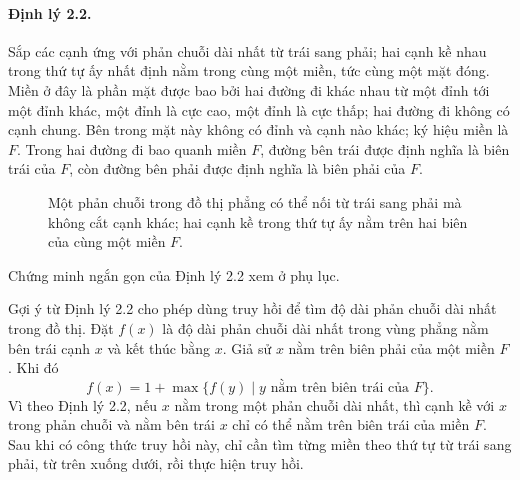 \documentclass[11pt]{article}
\begin{document}
\paragraph{Định lý 2.2.}
Sắp các cạnh ứng với phản chuỗi dài nhất từ trái sang phải; hai cạnh kề nhau
trong thứ tự ấy nhất định nằm trong cùng một miền, tức cùng một mặt đóng.
Miền ở đây là phần mặt được bao bởi hai đường đi khác nhau từ một đỉnh tới một
đỉnh khác, một đỉnh là cực cao, một đỉnh là cực thấp; hai đường đi không có
cạnh chung. Bên trong mặt này không có đỉnh và cạnh nào khác; ký hiệu miền là
\(F\). Trong hai đường đi bao quanh miền \(F\), đường bên trái được định nghĩa
là biên trái của \(F\), còn đường bên phải được định nghĩa là biên phải của
\(F\).

\begin{figure}[ht]
\centering
{}
\caption{Một phản chuỗi trong đồ thị phẳng có thể nối từ trái sang phải mà
không cắt cạnh khác; hai cạnh kề trong thứ tự ấy nằm trên hai biên của cùng
một miền \(F\).}
\end{figure}

Chứng minh ngắn gọn của Định lý 2.2 xem ở phụ lục.

Gợi ý từ Định lý 2.2 cho phép dùng truy hồi để tìm độ dài phản chuỗi dài nhất
trong đồ thị. Đặt \(f(x)\) là độ dài phản chuỗi dài nhất trong vùng phẳng nằm
bên trái cạnh \(x\) và kết thúc bằng \(x\). Giả sử \(x\) nằm trên biên phải
của một miền \(F\). Khi đó
\[
  f(x)=1+\max\{f(y)\mid y\text{ nằm trên biên trái của }F\}.
\]
Vì theo Định lý 2.2, nếu \(x\) nằm trong một phản chuỗi dài nhất, thì cạnh kề
với \(x\) trong phản chuỗi và nằm bên trái \(x\) chỉ có thể nằm trên biên trái
của miền \(F\). Sau khi có công thức truy hồi này, chỉ cần tìm từng miền theo
thứ tự từ trái sang phải, từ trên xuống dưới, rồi thực hiện truy hồi.
\end{document}
